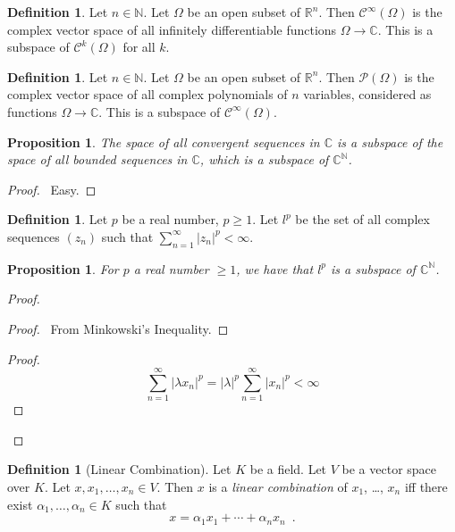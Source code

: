 \documentclass{book}
\let\qed\relax
\newtheorem{prop}[ax]{Proposition}
\theoremstyle{definition}
\newtheorem{df}[ax]{Definition}
\begin{document}
\begin{df}
Let $n \in \mathbb{N}$. Let $\Omega$ be an open subset of $\mathbb{R}^n$. Then $\mathcal{C}^\infty(\Omega)$ is the complex vector space of all infinitely differentiable functions $\Omega \rightarrow \mathbb{C}$. This is a subspace of $\mathcal{C}^k(\Omega)$ for all $k$.
\end{df}

\begin{df}
Let $n \in \mathbb{N}$. Let $\Omega$ be an open subset of $\mathbb{R}^n$. Then $\mathcal{P}(\Omega)$ is the complex vector space of all complex polynomials of $n$ variables, considered as functions $\Omega \rightarrow \mathbb{C}$. This is a subspace of $\mathcal{C}^\infty(\Omega)$.
\end{df}

\begin{prop}
The space of all convergent sequences in $\mathbb{C}$ is a subspace of the space of all bounded sequences in $\mathbb{C}$, which is a subspace of $\mathbb{C}^\mathbb{N}$.
\end{prop}

\begin{proof}
\pf\ Easy. \qed
\end{proof}

\begin{df}
Let $p$ be a real number, $p \geq 1$. Let $l^p$ be the set of all complex sequences $(z_n)$ such that $\sum_{n=1}^\infty |z_n|^p < \infty$.
\end{df}

\begin{prop}
For $p$ a real number $\geq 1$, we have that $l^p$ is a subspace of $\mathbb{C}^\mathbb{N}$.
\end{prop}

\begin{proof}
\pf
{}
\begin{proof}
	\pf\ From Minkowski's Inequality.
\end{proof}
\begin{proof}
	\pf
	\[ \sum_{n=1}^\infty |\lambda x_n|^p = |\lambda|^p \sum_{n=1}^\infty |x_n|^p < \infty \]
\end{proof}
\qed
\end{proof}

\begin{df}[Linear Combination]
Let $K$ be a field. Let $V$ be a vector space over $K$. Let $x, x_1, \ldots, x_n \in V$. Then $x$ is a \emph{linear combination} of $x_1$, \ldots, $x_n$ iff there exist $\alpha_1, \ldots, \alpha_n \in K$ such that
\[ x = \alpha_1 x_1 + \cdots + \alpha_n x_n \enspace . \]
\end{df}
\end{document}
